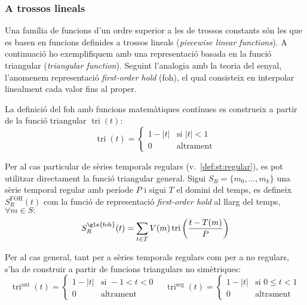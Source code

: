 \subsubsection{A trossos lineals}


Una família de funcions d'un ordre superior a les de trossos constants
són les que es basen en funcions definides a trossos lineals
(\emph{piecewise linear functions}).  A continuació ho exemplifiquem
amb una representació basada en la funció triangular (\emph{triangular
  function}). Seguint l'analogia amb la teoria del senyal, l'anomenem
representació \emph{first-order hold} (\gls{foh}), el qual consisteix
en interpolar linealment cada valor fins al proper.


La definició del \gls{foh} amb funcions matemàtiques contínues es construeix
a partir de la funció triangular $\operatorname{tri}(t)$:
\[
\operatorname{tri}(t) = 
\begin{cases}
  1-|t| & \text{si } |t| < 1\\
  0 & \text{altrament}
\end{cases}
\]

Per al cas particular de sèries temporals regulars
(v.~\autoref{def:st:regular}), es pot utilitzar directament la funció
triangular general.  Sigui $S_R=\{m_0,\ldots,m_k\}$ una sèrie temporal
regular amb període $P$ i sigui $T$ el domini del temps, es defineix
$S^\text{FOH}_ R(t)$ com la funció de representació \emph{first-order
  hold} al llarg del temps, $\forall m \in S:$
\[
S_ R^\text{\gls{foh}}(t) = \sum_{t\in T} V(m)
\operatorname{tri}\left(\frac{t-T(m)}{P}\right)
\]



Per al cas general, tant per a sèries temporals regulars com per a no
regulars, s'ha de construir a partir de funcions triangulars no
simètriques:
\[
\operatorname{tri}^{\text{ant}}(t) = 
\begin{cases}
  1-|t| & \text{si } -1 < t < 0\\
  0 & \text{altrament}
\end{cases}
\quad
\operatorname{tri}^{\text{seg}}(t) = 
\begin{cases}
  1-|t| & \text{si } 0 \leq t < 1\\
  0 & \text{altrament}
\end{cases}
\]


